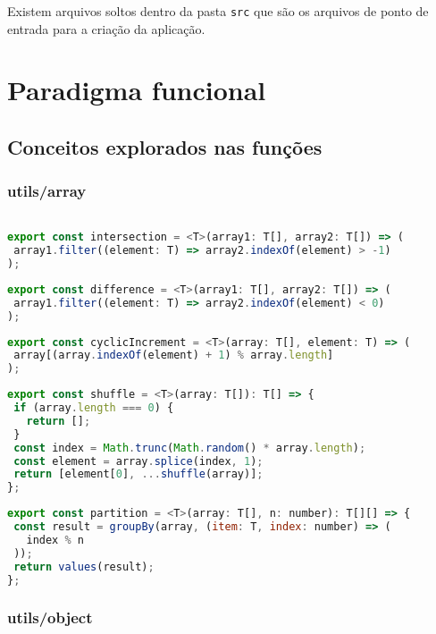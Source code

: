 \documentclass[rel_mlp]{iiufrgs}
\begin{document}
\par Existem arquivos soltos dentro da pasta \verb|src| que são os arquivos de ponto de entrada para a criação da aplicação.



\section{Paradigma funcional}

\subsection{Conceitos explorados nas funções}
\subsubsection{utils/array}

\begin{lstlisting}[language = JavaScript]

export const intersection = <T>(array1: T[], array2: T[]) => (
 array1.filter((element: T) => array2.indexOf(element) > -1)
);
\end{lstlisting}
\begin{lstlisting}[language = JavaScript]
export const difference = <T>(array1: T[], array2: T[]) => (
 array1.filter((element: T) => array2.indexOf(element) < 0)
);
\end{lstlisting}
\begin{lstlisting}[language = JavaScript]
export const cyclicIncrement = <T>(array: T[], element: T) => (
 array[(array.indexOf(element) + 1) % array.length]
);
\end{lstlisting}
\begin{lstlisting}[language = JavaScript]
export const shuffle = <T>(array: T[]): T[] => {
 if (array.length === 0) {
   return [];
 }
 const index = Math.trunc(Math.random() * array.length);
 const element = array.splice(index, 1);
 return [element[0], ...shuffle(array)];
};
\end{lstlisting}
\begin{lstlisting}[language = JavaScript]
export const partition = <T>(array: T[], n: number): T[][] => {
 const result = groupBy(array, (item: T, index: number) => (
   index % n
 ));
 return values(result);
};
\end{lstlisting}

\subsubsection{utils/object}
\end{document}
